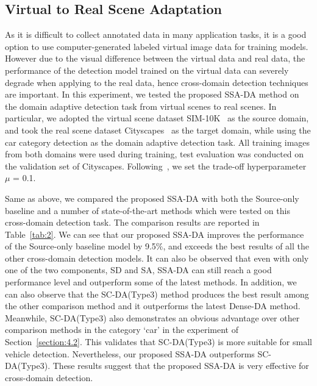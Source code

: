 \documentclass[runningheads]{llncs}
\begin{document}
\subsection{Virtual to Real Scene Adaptation}
As it is difficult to collect annotated data in many application tasks, 
it is a good option to use computer-generated labeled virtual image data for training models. 
However due to the visual difference between the virtual data and real data, 
the performance of the detection model trained on the virtual data can severely degrade when applying to the real data,
hence cross-domain detection techniques are important.
In this experiment, we tested the proposed SSA-DA method on the 
domain adaptive detection task from virtual scenes to real scenes. 
In particular, we adopted the virtual scene dataset SIM-10K~\cite{JohnsonDriving} as the source domain, 
and took the real scene dataset Cityscapes~\cite{cordts2016cityscapes} as the target domain, 
while using the car category detection as the domain adaptive detection task. 
All training images from both domains were used during training, 
test evaluation was conducted on the validation set of Cityscapes.
Following~\cite{chen2018domain},  
we set the trade-off hyperparameter $\mu$ = 0.1. 

Same as above, we compared the proposed SSA-DA with both the Source-only baseline and a number of state-of-the-art methods
which were tested on this cross-domain detection task.
The comparison results are reported in Table~\ref{tab:2}. 
We can see that our proposed SSA-DA improves the performance of the Source-only baseline model by 9.5$\%$, 
and exceeds the best results of all the other cross-domain detection models. 
It can also be observed that 
even with only one of the two components, SD and SA, SSA-DA 
can still reach a good performance level and outperform some of the latest methods.
In addition, we can also observe 
that the SC-DA(Type3) method produces the best result among the other comparison method
and it outperforms the latest Dense-DA method. 
Meanwhile, 
SC-DA(Type3) also demonstrates an obvious advantage over other comparison methods in the category `car' in 
the experiment of Section~\ref{section:4.2}. 
This validates that SC-DA(Type3) 
is more suitable for small vehicle detection.  
Nevertheless, our proposed SSA-DA outperforms SC-DA(Type3).
These results suggest that the proposed SSA-DA is very effective for cross-domain detection.
\end{document}
